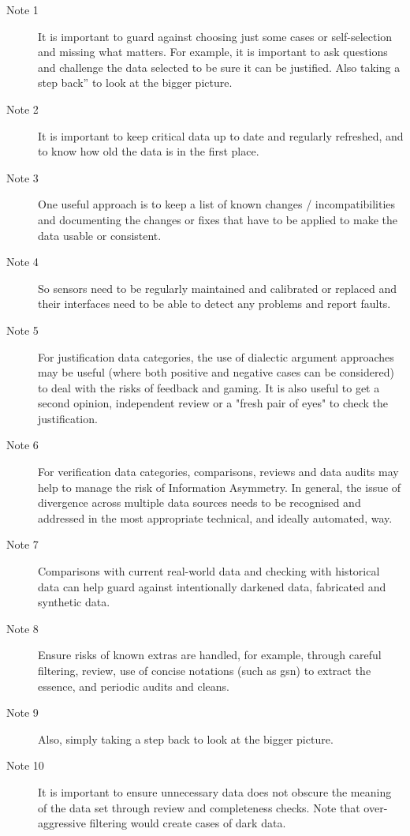 \begin{description}
\item[Note 1] It is important to guard against choosing just
some cases or self-selection and missing what matters. For example, it is important to ask
questions and challenge the data selected to be sure it can be justified. Also taking a step
back” to look at the bigger picture.
\item[Note 2] It is important to keep critical data up to date and
regularly refreshed, and to know how old the data is in the first place.
\item[Note 3] One useful approach is to keep a list of known changes /
incompatibilities and documenting the changes or fixes that have to be applied to make the
data usable or consistent.
\item[Note 4] So sensors need to be regularly maintained and calibrated or
replaced and their interfaces need to be able to detect any problems and report faults.
\item[Note 5] For justification data categories, the use of dialectic
argument approaches may be useful (where both positive and negative cases can be
considered) to deal with the risks of feedback and gaming. It is also useful to get a second
opinion, independent review or a "fresh pair of eyes" to check the justification.
\item[Note 6] For verification data categories, comparisons,
reviews and data audits may help to manage the risk of Information Asymmetry. In general,
the issue of divergence across multiple data sources needs to be recognised and addressed in
the most appropriate technical, and ideally automated, way.
\item[Note 7] Comparisons with current real-world data and checking with
historical data can help guard against intentionally darkened data, fabricated and synthetic
data.
\item[Note 8] Ensure risks of known extras are handled, for example,
through careful filtering, review, use of concise notations (such as \gls{gsn})
to extract the essence, and periodic audits and cleans.
\item[Note 9] Also, simply taking a step back to look at the bigger
picture.
\item[Note 10] It is important to ensure unnecessary data does
not obscure the meaning of the data set through review and completeness checks. Note that
over-aggressive filtering would create cases of dark data.
\end{description}
\clearpage%
